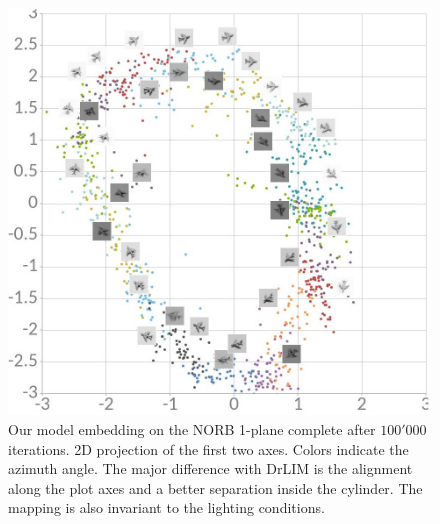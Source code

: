 \documentclass[a4paper,12pt]{report}
\begin{document}
\begin{figure}
    \centering
    \includegraphics[width=\textwidth]{thesis_figures/norb_cl2d.jpg}
    \caption{Our model embedding on the NORB 1-plane complete after $100'000$ iterations.
    2D projection of the first two axes.
    Colors indicate the azimuth angle.
    The major difference with DrLIM is the alignment along the plot axes and a better separation inside the cylinder.
    The mapping is also invariant to the lighting conditions.
    }
    \label{fig:norb_cl2d_embedding_1}
\end{figure}
\end{document}
